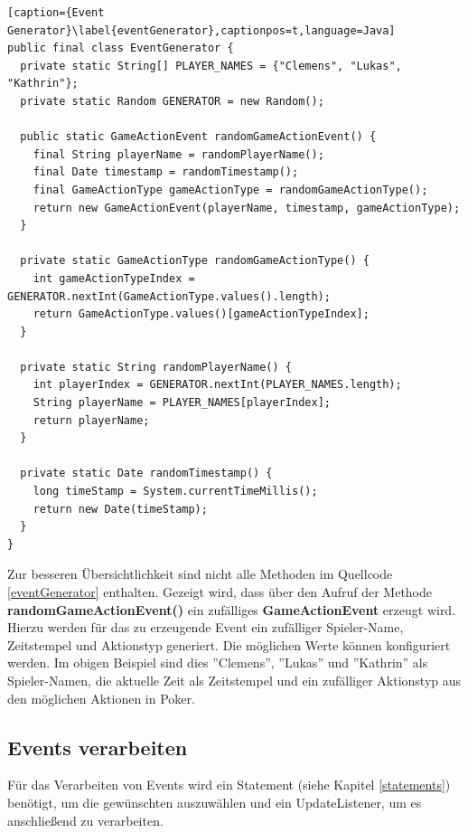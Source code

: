 \begin{lstlisting}[caption={Event Generator}\label{eventGenerator},captionpos=t,language=Java]
public final class EventGenerator {
  private static String[] PLAYER_NAMES = {"Clemens", "Lukas", "Kathrin"};
  private static Random GENERATOR = new Random();
  
  public static GameActionEvent randomGameActionEvent() {
    final String playerName = randomPlayerName();
    final Date timestamp = randomTimestamp();
    final GameActionType gameActionType = randomGameActionType();
    return new GameActionEvent(playerName, timestamp, gameActionType);
  }

  private static GameActionType randomGameActionType() {
    int gameActionTypeIndex = GENERATOR.nextInt(GameActionType.values().length);
    return GameActionType.values()[gameActionTypeIndex];
  }

  private static String randomPlayerName() {
    int playerIndex = GENERATOR.nextInt(PLAYER_NAMES.length);
    String playerName = PLAYER_NAMES[playerIndex];
    return playerName;
  }

  private static Date randomTimestamp() {
    long timeStamp = System.currentTimeMillis();
    return new Date(timeStamp);
  }
}
\end{lstlisting}

Zur besseren Übersichtlichkeit sind nicht alle Methoden im Quellcode \ref{eventGenerator} enthalten.
Gezeigt wird, dass über den Aufruf der Methode \textbf{randomGameActionEvent()} ein zufälliges \textbf{GameActionEvent} erzeugt wird. Hierzu werden für das zu erzeugende Event ein zufälliger Spieler-Name, Zeitstempel und Aktionstyp generiert. Die möglichen Werte können konfiguriert werden. Im obigen Beispiel sind dies ''Clemens'', ''Lukas'' und ''Kathrin'' als Spieler-Namen, die aktuelle Zeit als Zeitstempel und ein zufälliger Aktionstyp aus den möglichen Aktionen in Poker.

\subsection{Events verarbeiten}
Für das Verarbeiten von Events wird ein Statement (siehe Kapitel \ref{statements}) benötigt, um die gewünschten auszuwählen und ein UpdateListener, um es anschließend zu verarbeiten. 
